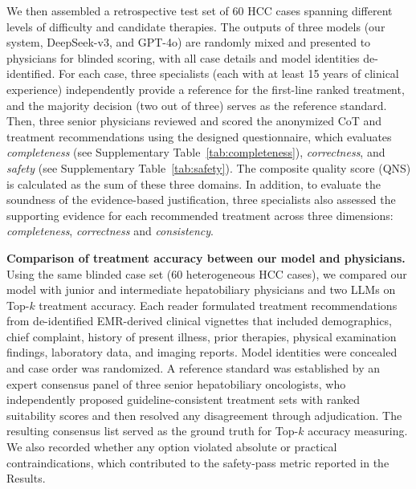 \documentclass{article}
\begin{document}
We then assembled a retrospective test set of 60 HCC cases spanning different levels of difficulty and candidate therapies. The outputs of three models (our system, DeepSeek-v3, and GPT-4o) are randomly mixed and presented to physicians for blinded scoring, with all case details and model identities de-identified. For each case, three specialists (each with at least 15 years of clinical experience) independently provide a reference for the first-line ranked treatment, and the majority decision (two out of three) serves as the reference standard. Then, three senior physicians reviewed and scored the anonymized CoT and treatment recommendations using the designed questionnaire, which evaluates \emph{completeness} (see Supplementary Table~\ref{tab:completeness}), \emph{correctness}, and \emph{safety} (see Supplementary Table~\ref{tab:safety}). The composite quality score (QNS) is calculated as the sum of these three domains. In addition, to evaluate the soundness of the evidence-based justification, three specialists also assessed the supporting evidence for each recommended treatment across three dimensions: \emph{completeness}, \emph{correctness} and \emph{consistency}. 

\textbf{Comparison of treatment accuracy between our model and physicians.}
Using the same blinded case set (60 heterogeneous HCC cases), we compared our model with junior and intermediate hepatobiliary physicians and two LLMs on Top-$k$ treatment accuracy. 
Each reader formulated treatment recommendations from de-identified EMR-derived clinical vignettes that included demographics, chief complaint, history of present illness, prior therapies, physical examination findings, laboratory data, and imaging reports. Model identities were concealed and case order was randomized.
A reference standard was established by an expert consensus panel of three senior hepatobiliary oncologists, who independently proposed guideline-consistent treatment sets with ranked suitability scores and then resolved any disagreement through adjudication. The resulting consensus list served as the ground truth for Top-$k$ accuracy measuring. We also recorded whether any option violated absolute or practical contraindications, which contributed to the safety-pass metric reported in the Results.
\end{document}
